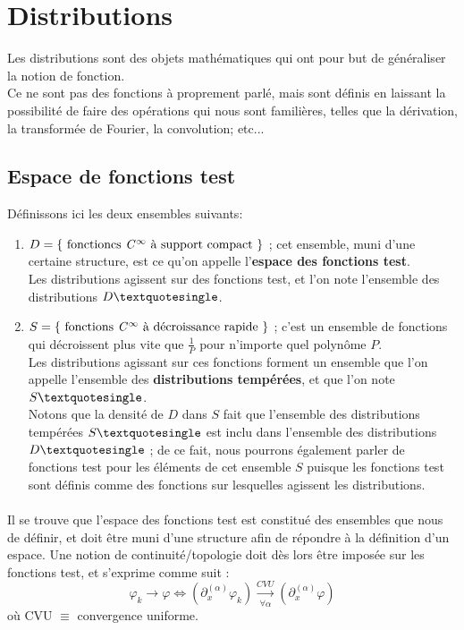 \documentclass[../notesdecours.tex]{subfiles}
\begin{document}
\section{Distributions}
Les distributions sont des objets mathématiques qui ont pour but de généraliser la notion de fonction. \\
Ce ne sont pas des fonctions à proprement parlé, mais sont définis en laissant la possibilité de faire des opérations
qui nous sont familières, telles que la dérivation, la transformée de Fourier, la convolution; etc... \\

\subsection{Espace de fonctions test}

Définissons ici les deux ensembles suivants: 
\begin{enumerate}
    \item $D = \left\{ \mbox{ fonctioncs \textit{C}$^{\infty}$ à support compact } \right\}$ ; cet ensemble, muni d'une certaine structure, est ce qu'on appelle l'\textbf{espace des fonctions test}.\\ 
    Les distributions agissent sur des fonctions test, et l'on note l'ensemble des distributions $D \textquotesingle$. \\
    \item $S = \left\{ \mbox{ fonctions \textit{C}$^{\infty}$ à décroissance rapide } \right\}$ ; c'est un ensemble de fonctions qui décroissent plus vite que $\frac{1}{P}$ pour n'importe quel polynôme $P$. \\
    Les distributions agissant sur ces fonctions forment un ensemble que l'on appelle l'ensemble des \textbf{distributions tempérées}, et que l'on note $S \textquotesingle$. \\
    Notons que la densité de $D$ dans $S$ fait que l'ensemble des distributions tempérées $S \textquotesingle$ est inclu dans l'ensemble des distributions $D \textquotesingle$ ;
    de ce fait, nous pourrons également parler de fonctions test pour les éléments de cet ensemble $S$ puisque les fonctions test sont définis comme des fonctions sur lesquelles agissent les distributions. 
\end{enumerate}

\paragraph{} Il se trouve que l'espace des fonctions test est constitué des ensembles que nous de définir, 
et doit être muni d'une structure afin de répondre à la définition d'un espace. 
Une notion de continuité/topologie doit dès lors être imposée sur les fonctions test, et s'exprime comme suit :
\begin{equation}
\varphi_k \rightarrow \varphi \iff (\partial_x^{(\alpha)} \varphi_k) \xrightarrow[\forall \alpha]{CVU} (\partial_x^{(\alpha)}\varphi)
\end{equation}
où CVU $\equiv$ convergence uniforme.
\end{document}
